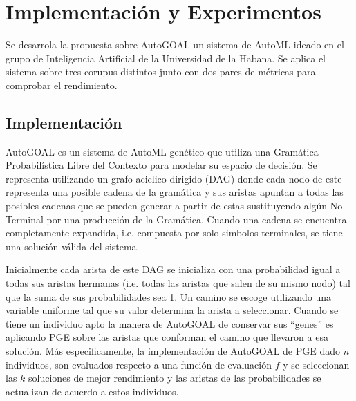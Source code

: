 \chapter{Implementación y Experimentos}\label{chapter:implementation}



Se desarrola la propuesta sobre AutoGOAL un sistema de AutoML ideado en el grupo de Inteligencia Artificial de la Universidad de la Habana.
Se aplica el sistema sobre tres corupus distintos junto con dos pares de m\'etricas para comprobar el rendimiento.

\section{Implementaci\'on}


AutoGOAL es un sistema de AutoML gen\'etico que utiliza una Gram\'atica Probabil\'istica Libre del Contexto  para modelar su espacio de decisi\'on. Se representa utilizando un grafo aciclico dirigido (DAG) donde cada nodo de este representa una posible cadena de la gram\'atica y sus aristas apuntan a todas las posibles cadenas que se pueden generar a partir de estas sustituyendo alg\'un No Terminal por una producci\'on de la Gram\'atica. Cuando una cadena se encuentra completamente expandida, i.e. compuesta por solo simbolos terminales, se tiene una soluci\'on v\'alida del sistema. 

Inicialmente cada arista de este DAG se inicializa con una probabilidad igual a todas sus aristas hermanas (i.e. todas las aristas que salen de su mismo nodo) tal que la suma de sus probabilidades sea 1. Un camino se escoge utilizando una variable uniforme tal que su valor determina la arista a seleccionar. Cuando se tiene un individuo apto la manera de AutoGOAL de conservar sus ``genes'' es aplicando PGE sobre las aristas que conforman el camino que llevaron a esa soluci\'on. M\'as especificamente, la implementaci\'on de AutoGOAL de PGE dado $n$ individuos, son evaluados respecto a una funci\'on de evaluaci\'on $f$ y se seleccionan las $k$ soluciones de mejor rendimiento y las aristas de las probabilidades se actualizan de acuerdo a estos individuos. 

